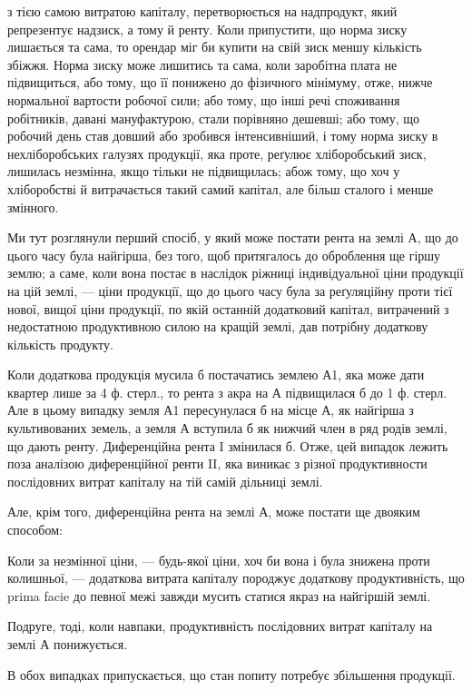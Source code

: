 \parcont{}  %
з тією самою витратою капіталу, перетворюється на надпродукт, який репрезентує
надзиск, а тому й ренту. Коли припустити, що норма зиску лишається
та сама, то орендар міг би купити на свій зиск меншу кількість збіжжя.
Норма зиску може лишитись та сама, коли заробітна плата не підвищиться,
або тому, що її понижено до фізичного мінімуму, отже, нижче нормальної вартости
робочої сили; або тому, що інші речі споживання робітників, давані мануфактурою,
стали порівняно дешевші; або тому, що робочий день став довший
або зробився інтенсивніший, і тому норма зиску в нехліборобських галузях
продукції, яка проте, реґулює хліборобський зиск, лишилась незмінна, якщо
тільки не підвищилась; абож тому, що хоч у хліборобстві й витрачається такий
самий капітал, але більш сталого і менше змінного.

Ми тут розглянули перший спосіб, у який може постати рента на землі
А, що до цього часу була найгірша, без того, щоб притягалось до оброблення
ще гіршу землю; а саме, коли вона постає в наслідок ріжниці індивідуальної
ціни продукції на цій землі, — ціни продукції, що до цього часу була за
реґуляційну проти тієї нової, вищої ціни продукції, по якій останній додатковий
капітал, витрачений з недостатною продуктивною силою на кращій землі,
дав потрібну додаткову кількість продукту.

Коли додаткова продукція мусила б постачатись землею А1, яка може дати
квартер лише за 4 ф. стерл., то рента з акра на А підвищилася б до 1 ф. стерл. Але в цьому випадку
земля А1 пересунулася б на місце А, як
найгірша з культивованих земель, а земля А вступила б як нижчий член в
ряд родів землі, що дають ренту. Диференційна рента I змінилася б. Отже,
цей випадок лежить поза аналізою диференційної ренти II, яка виникає з різної
продуктивности послідовних витрат капіталу на тій самій дільниці землі.

Але, крім того, диференційна рента на землі А, може постати ще двояким
способом:

Коли за незмінної ціни, — будь-якої ціни, хоч би вона і була знижена
проти колишньої, — додаткова витрата капіталу породжує додаткову продуктивність,
що prima facie до певної межі завжди мусить статися якраз на найгіршій
землі.

Подруге, тоді, коли навпаки, продуктивність послідовних витрат капіталу
на землі А понижується.

В обох випадках припускається, що стан попиту потребує збільшення
продукції.

